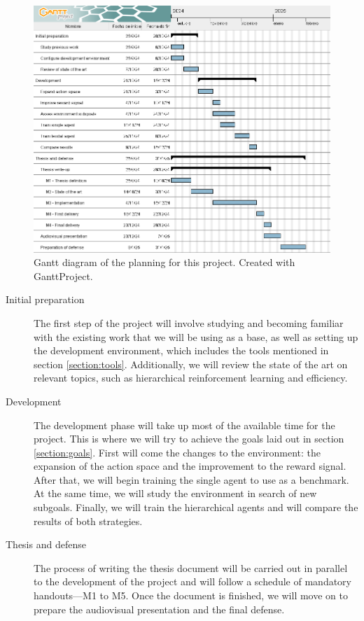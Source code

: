 \begin{figure}[!h]
    \centering
    \includegraphics[width=.9\textwidth]{figs/TFM_Gannt.png}
    \caption[Gantt diagram of the planning for this project]{Gantt diagram of the planning for this project. Created with GanttProject\protect\footnotemark.}
    \label{fig:gantt}
\end{figure}

\begin{description}
    \item[Initial preparation] The first step of the project will involve studying and becoming familiar with the existing work that we will be using as a base, as well as setting up the development environment, which includes the tools mentioned in section \ref{section:tools}. Additionally, we will review the state of the art on relevant topics, such as hierarchical reinforcement learning and efficiency.
    \item[Development] The development phase will take up most of the available time for the project. This is where we will try to achieve the goals laid out in section \ref{section:goals}. First will come the changes to the environment: the expansion of the action space and the improvement to the reward signal. After that, we will begin training the single agent to use as a benchmark. At the same time, we will study the environment in search of new subgoals. Finally, we will train the hierarchical agents and will compare the results of both strategies.
    \item[Thesis and defense] The process of writing the thesis document will be carried out in parallel to the development of the project and will follow a schedule of mandatory handouts---M1 to M5. Once the document is finished, we will move on to prepare the audiovisual presentation and the final defense.
\end{description}

